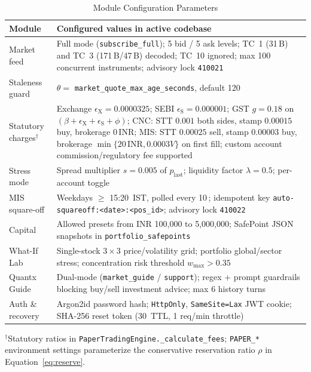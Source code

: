 \documentclass[12pt]{article}
\newcommand{\thinunit}[2]{#1\,\text{#2}}
\begin{document}
\begin{table}[!htbp]\begin{singlespace}
\caption{Module Configuration Parameters}
\label{tab:config}
\centering
\small
\renewcommand{\arraystretch}{1.12}
\begin{tabularx}{\textwidth}{@{}>{\raggedright\arraybackslash}p{1.35in}X@{}}
\toprule
Module & Configured values in active codebase \\
\midrule
Market feed & Full mode (\texttt{subscribe\_full}); 5 bid / 5 ask levels; TC~1 (31\,B) and TC~3 (171\,B/47\,B) decoded; TC~10 ignored; max 100 concurrent instruments; advisory lock \texttt{410021} \\
Staleness guard & $\theta=$ \texttt{market\_quote\_max\_age\_seconds}, default \thinunit{120}{s} \\
Statutory charges$^{\dagger}$ & Exchange $\epsilon_{\mathrm{X}}=0.0000325$; SEBI $\epsilon_{\mathrm{S}}=0.000001$; GST $g=0.18$ on $(\beta+\epsilon_{\mathrm{X}}+\epsilon_{\mathrm{S}}+\phi)$; CNC: STT $0.001$ both sides, stamp $0.00015$ buy, brokerage $\thinunit{0}{INR}$; MIS: STT $0.00025$ sell, stamp $0.00003$ buy, brokerage $\min\{\thinunit{20}{INR}, 0.0003V\}$ on first fill; custom account commission/regulatory fee supported \\
Stress mode & Spread multiplier $s=0.005$ of $p_{\mathrm{last}}$; liquidity factor $\lambda=0.5$; per-account toggle \\
MIS square-off & Weekdays $\ge$ 15:20~IST, polled every \thinunit{10}{s}; idempotent key \texttt{auto-squareoff:<date>:<pos\_id>}; advisory lock \texttt{410022} \\
Capital & Allowed presets from INR 100,000 to 5,000,000; SafePoint JSON snapshots in \texttt{portfolio\_safepoints} \\
What-If Lab & Single-stock $3\times 3$ price/volatility grid; portfolio global/sector stress; concentration risk threshold $w_{\max} > 0.35$ \\
Quantx Guide & Dual-mode (\texttt{market\_guide} / \texttt{support}); regex + prompt guardrails blocking buy/sell investment advice; max 6 history turns \\
Auth \& recovery & Argon2id password hash; \texttt{HttpOnly}, \texttt{SameSite=Lax} JWT cookie; SHA-256 reset token (\thinunit{30}{min} TTL, 1 req/min throttle) \\
\bottomrule
\end{tabularx}

\vspace{2pt}
{\footnotesize $^{\dagger}$Statutory ratios in \texttt{PaperTradingEngine.\_calculate\_fees}; \texttt{PAPER\_*} environment settings parameterize the conservative reservation ratio $\rho$ in Equation~\eqref{eq:reserve}.}
\end{singlespace}\end{table}
\end{document}
